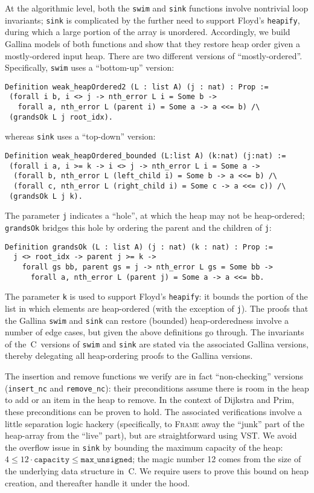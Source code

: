 At the algorithmic level, both the \texttt{swim} and \texttt{sink} functions involve nontrivial loop invariants; \texttt{sink} is complicated by the further need to support Floyd's \texttt{heapify}, during which a large portion of the array is unordered.  Accordingly, we build Gallina models of both functions and show that they restore heap order given a mostly-ordered input heap.  There are two different versions of ``mostly-ordered''. Specifically, \texttt{swim} uses a ``bottom-up'' version:
\begin{lstlisting}
Definition weak_heapOrdered2 (L : list A) (j : nat) : Prop :=
 (forall i b, i <> j -> nth_error L i = Some b ->
   forall a, nth_error L (parent i) = Some a -> a <<= b) /\
 (grandsOk L j root_idx).
\end{lstlisting}
whereas \texttt{sink} uses a ``top-down'' version:
\begin{lstlisting}
Definition weak_heapOrdered_bounded (L:list A) (k:nat) (j:nat) :=
 (forall i a, i >= k -> i <> j -> nth_error L i = Some a ->
  (forall b, nth_error L (left_child i) = Some b -> a <<= b) /\
  (forall c, nth_error L (right_child i) = Some c -> a <<= c)) /\
 (grandsOk L j k).
\end{lstlisting}
The parameter \texttt{j} indicates a ``hole'', at which the heap may not be heap-ordered; \texttt{grandsOk} bridges this hole by
ordering the parent and the children of \texttt{j}:
\begin{lstlisting}
Definition grandsOk (L : list A) (j : nat) (k : nat) : Prop :=
  j <> root_idx -> parent j >= k ->
    forall gs bb, parent gs = j -> nth_error L gs = Some bb ->
      forall a, nth_error L (parent j) = Some a -> a <<= bb.
\end{lstlisting}
The parameter \texttt{k} is used to support Floyd's \texttt{heapify}: it bounds the portion of the list in which elements are heap-ordered (with the exception of \texttt{j}).  The proofs that the Gallina \texttt{swim} and \texttt{sink} can restore (bounded) heap-orderedness involve a number of edge cases, but given the above definitions go through.  The invariants of the~C~versions of \texttt{swim} and \texttt{sink} are stated via the associated
Gallina versions, thereby delegating all heap-ordering proofs to the Gallina versions.

The insertion and remove functions we verify are in fact ``non-checking'' versions (\texttt{insert\_nc} and \texttt{remove\_nc}): their preconditions assume there is room in the heap to add or an item in the heap to remove.  In the context of Dijkstra and Prim, these preconditions can be proven to hold.  The associated verifications involve a little separation logic hackery (specifically, to \textsc{Frame} away the ``junk'' part of the heap-array from the ``live'' part), but are straightforward using VST.  We avoid the overflow issue in \texttt{sink} by bounding the maximum capacity of the heap: $4 \le 12\cdot\texttt{capacity} \leq \texttt{max\_unsigned}$; the magic number 12 comes from the size of the underlying data structure in~C.  We require users to prove this bound on heap creation, and thereafter handle it under the hood.

